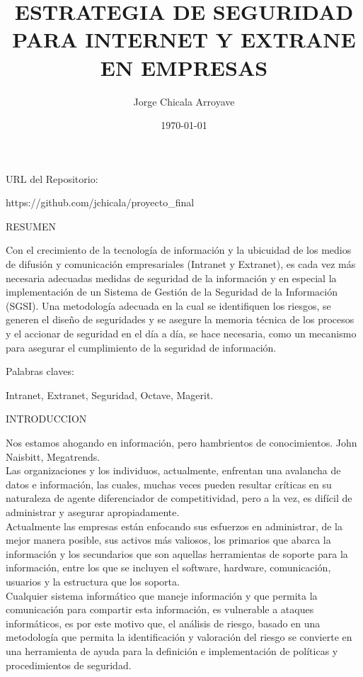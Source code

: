 \documentclass[a4paper,11pt]{article}
\begin{document}
\title{ESTRATEGIA DE SEGURIDAD PARA INTERNET Y EXTRANE EN EMPRESAS}
\author{Jorge Chicala Arroyave}
\date{\today}
\maketitle
\begin{bf}
URL del Repositorio:
\end{bf}
https://github.com/jchicala/proyecto\_final
\begin{bf}
\begin{center}
RESUMEN \\
\end{center}
\end{bf}
Con el crecimiento de la tecnología de información y la ubicuidad de los medios
de difusión y comunicación empresariales (Intranet y Extranet), es cada vez más
necesaria adecuadas medidas de seguridad de la información y en especial la 
implementación de un Sistema de Gestión de la Seguridad de la Información (SGSI).
 Una metodología adecuada en la cual se identifiquen los riesgos, se generen el 
diseño de seguridades y se asegure la memoria técnica de los procesos y el 
accionar de seguridad en el día a día, se hace necesaria, como un mecanismo para asegurar el cumplimiento de la seguridad de información.\\   
\begin{bf}
Palabras claves:
\end{bf}
Intranet, Extranet, Seguridad, Octave, Magerit. \\
\begin{minipage}[t]{0.5\textwidth}
\begin{bf}
INTRODUCCION\\
\end{bf}
Nos estamos ahogando en información, pero hambrientos de conocimientos. 
John Naisbitt, Megatrends.\\
Las organizaciones y los individuos, actualmente, enfrentan una avalancha de 
datos e información, las cuales, muchas veces pueden resultar críticas en su 
naturaleza de agente diferenciador de competitividad, pero a la vez, es difícil 
de administrar y asegurar apropiadamente.\\
Actualmente las empresas están enfocando sus esfuerzos en administrar, de la 
mejor manera posible, sus activos más valiosos, los primarios que abarca la 
información y los secundarios que son aquellas herramientas de soporte para la 
información, entre los que se incluyen el software, hardware, comunicación, 
usuarios y la estructura que los soporta.\\
Cualquier sistema informático que maneje información y que permita la comunicación 
para compartir esta información, es vulnerable a ataques informáticos, es por 
este motivo que, el análisis de riesgo, basado en una metodología que permita la identificación y valoración del riesgo se convierte en una herramienta 
de ayuda para la definición e implementación de políticas y procedimientos de 
seguridad.\\   

\end{minipage}
\cite{Monte2015}
\cite{OccupyTheWeb2019}


\end{document}

